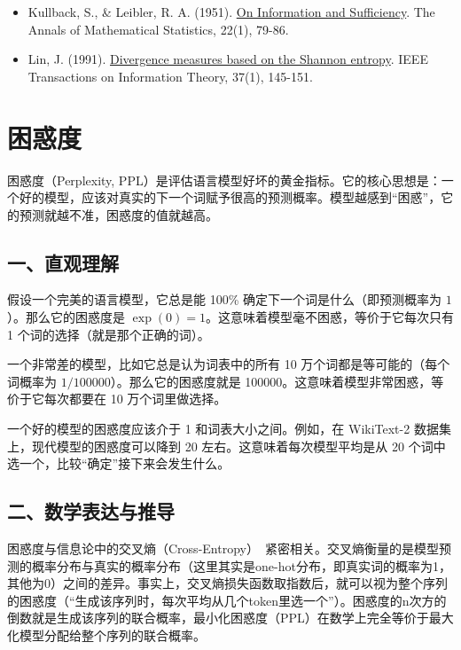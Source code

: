 \begin{itemize}
\tightlist
\item
  Kullback, S., \& Leibler, R. A. (1951). \href{https://doi.org/10.1214/aoms/1177729694}{On Information and Sufficiency}. The Annals of Mathematical Statistics, 22(1), 79-86.
\item
  Lin, J. (1991). \href{https://doi.org/10.1109/18.61115}{Divergence measures based on the Shannon entropy}. IEEE Transactions on Information Theory, 37(1), 145-151.
\end{itemize}

\clearpage

\hypertarget{ux56f0ux60d1ux5ea6}{%
\section{困惑度}\label{ux56f0ux60d1ux5ea6}}

困惑度（Perplexity, PPL）是评估语言模型好坏的黄金指标。它的核心思想是：一个好的模型，应该对真实的下一个词赋予很高的预测概率。模型越感到``困惑''，它的预测就越不准，困惑度的值就越高。

\hypertarget{ux4e00ux76f4ux89c2ux7406ux89e3}{%
\subsection{一、直观理解}\label{ux4e00ux76f4ux89c2ux7406ux89e3}}

假设一个完美的语言模型，它总是能 100\% 确定下一个词是什么（即预测概率为 \(1\)）。那么它的困惑度是 \(\exp(0)=1\)。这意味着模型毫不困惑，等价于它每次只有 1 个词的选择（就是那个正确的词）。

一个非常差的模型，比如它总是认为词表中的所有 10 万个词都是等可能的（每个词概率为 \(1/100000\)）。那么它的困惑度就是 100000。这意味着模型非常困惑，等价于它每次都要在 10 万个词里做选择。

一个好的模型的困惑度应该介于 1 和词表大小之间。例如，在 WikiText-2 数据集上，现代模型的困惑度可以降到 20 左右。这意味着每次模型平均是从 20 个词中选一个，比较``确定''接下来会发生什么。

\hypertarget{ux4e8cux6570ux5b66ux8868ux8fbeux4e0eux63a8ux5bfc}{%
\subsection{二、数学表达与推导}\label{ux4e8cux6570ux5b66ux8868ux8fbeux4e0eux63a8ux5bfc}}

困惑度与信息论中的交叉熵（Cross-Entropy）~紧密相关。交叉熵衡量的是模型预测的概率分布与真实的概率分布（这里其实是one-hot分布，即真实词的概率为1，其他为0）之间的差异。事实上，交叉熵损失函数取指数后，就可以视为整个序列的困惑度（``生成该序列时，每次平均从几个token里选一个''）。困惑度的n次方的倒数就是生成该序列的联合概率，最小化困惑度（PPL）在数学上完全等价于最大化模型分配给整个序列的联合概率。

